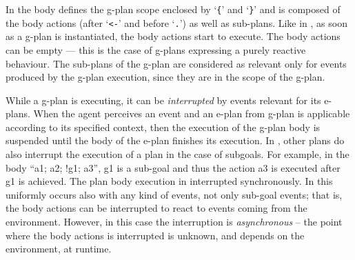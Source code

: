 In {\aser} the body defines the g-plan scope enclosed by `\texttt{\{}'
and `\texttt{\}}' and is composed of the body actions (after `\texttt{<-}'
and before `\texttt{.}')  as well as sub-plans.
%
Like in {\asl}, as soon as a g-plan is instantiated, the body actions
start to execute. The body actions can be empty --- this is the case
of g-plans expressing a purely reactive behaviour.
%
The sub-plans of the g-plan are considered as relevant only for events
produced by the g-plan execution, since they are in the scope of the g-plan.

%
%
%


While a g-plan is executing, it can be \emph{interrupted} by events
relevant for its e-plans. When the agent perceives an event and an
e-plan from g-plan is applicable according to its specified context,
then the execution of the g-plan body is suspended until the body of
the e-plan finishes its execution.
%
In {\asl}, other plans do also interrupt the execution of a plan in
the case of subgoals. For example, in the body ``\textsf{a1; a2; !g1;
  a3}'', \textsf{g1} is a sub-goal and thus the action \textsf{a3} is
executed after \textsf{g1} is achieved. The plan body
execution in interrupted synchronously.
%
In {\aser} this uniformly occurs also with any kind of events, not
only sub-goal events; that is, the body actions can be interrupted to
react to events coming from the environment. However, in this case the
interruption is \emph{asynchronous} -- the point where the body
actions is interrupted is unknown, and depends on the environment, at
runtime.
%


